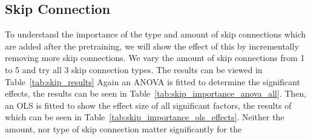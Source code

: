 \subsection{Skip Connection}
To understand the importance of the type and amount of skip connections which are added after the pretraining, we will show the effect of this by incrementally removing more skip connections. We vary the amount of skip connections from 1 to 5 and try all 3 skip connection types. The results can be viewed in Table~\ref{tab:skip_results}
Again an ANOVA is fitted to determine the significant effects, the results can be seen in Table~\ref{tab:skip_importance_anova_all}. Then, an OLS is fitted to show the effect size of all significant factors, the results of which can be seen in Table~\ref{tab:skip_importance_ols_effects}. Neither the amount, nor type of skip connection matter significantly for the 




